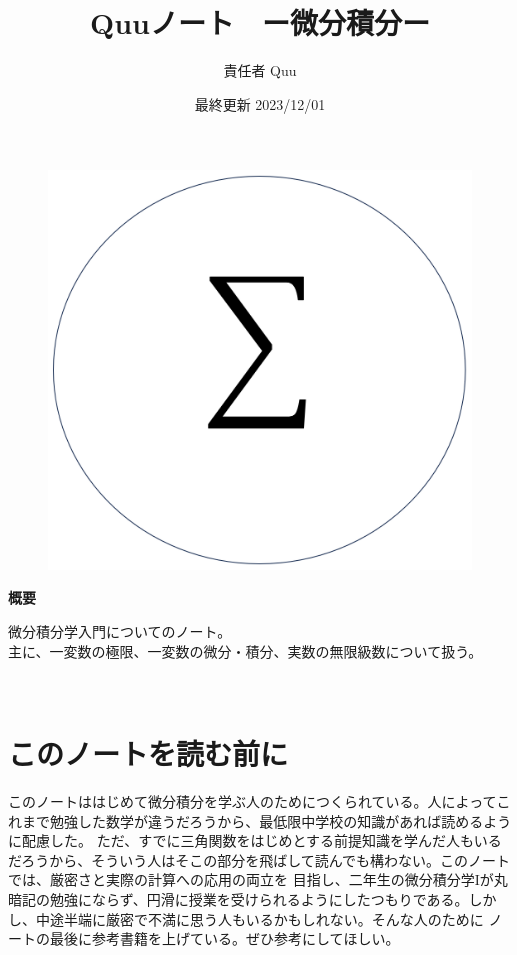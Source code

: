 \documentclass[a4j,dvipdfmx]{jsarticle}
\title{Quuノート　ー微分積分\ajRoman{1}ー}
\date{最終更新 2023/12/01}
\author{責任者 Quu}
\begin{document}
    \maketitle
    \thispagestyle{empty}
    \begin{figure}[h]
        \centering
        \includegraphics[scale=0.5]{img/QuuNote/icon.png}
    \end{figure}
    
    \centerline{\textbf{概要}}
    \noindent
    微分積分学入門についてのノート。\\
    主に、一変数の極限、一変数の微分・積分、実数の無限級数について扱う。
    
    \clearpage
    　
    \clearpage
    \part*{このノートを読む前に}
        このノートははじめて微分積分を学ぶ人のためにつくられている。人によってこれまで勉強した数学が違うだろうから、最低限中学校の知識があれば読めるように配慮した。
        ただ、すでに三角関数をはじめとする前提知識を学んだ人もいるだろうから、そういう人はそこの部分を飛ばして読んでも構わない。このノートでは、厳密さと実際の計算への応用の両立を
        目指し、二年生の微分積分学Iが丸暗記の勉強にならず、円滑に授業を受けられるようにしたつもりである。しかし、中途半端に厳密で不満に思う人もいるかもしれない。そんな人のために
        ノートの最後に参考書籍を上げている。ぜひ参考にしてほしい。
\end{document}
